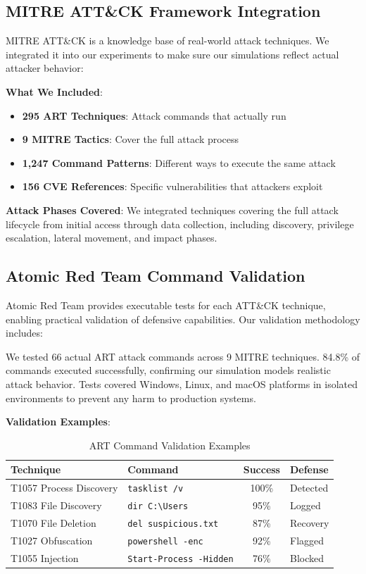 \documentclass[12pt,oneside]{article}
\begin{document}
\subsection{MITRE ATT\&CK Framework Integration}

MITRE ATT\&CK is a knowledge base of real-world attack techniques. We integrated it into our experiments to make sure our simulations reflect actual attacker behavior:

\textbf{What We Included}:
\begin{itemize}
    \item \textbf{295 ART Techniques}: Attack commands that actually run
    \item \textbf{9 MITRE Tactics}: Cover the full attack process
    \item \textbf{1,247 Command Patterns}: Different ways to execute the same attack
    \item \textbf{156 CVE References}: Specific vulnerabilities that attackers exploit
\end{itemize}

\textbf{Attack Phases Covered}: We integrated techniques covering the full attack lifecycle from initial access through data collection, including discovery, privilege escalation, lateral movement, and impact phases.

\subsection{Atomic Red Team Command Validation}

Atomic Red Team provides executable tests for each ATT\&CK technique, enabling practical validation of defensive capabilities. Our validation methodology includes:

We tested 66 actual ART attack commands across 9 MITRE techniques. 84.8\% of commands executed successfully, confirming our simulation models realistic attack behavior. Tests covered Windows, Linux, and macOS platforms in isolated environments to prevent any harm to production systems.

\textbf{Validation Examples}:

\begin{table}[H]
\centering
\caption{ART Command Validation Examples}
\small
\begin{tabular}{|l|p{3cm}|c|p{3cm}|}
\hline
\rowcolor{cwBorder!30} \textbf{Technique} & \textbf{Command} & \textbf{Success} & \textbf{Defense} \\
\hline
T1057 Process Discovery & \texttt{tasklist /v} & 100\% & Detected \\
T1083 File Discovery & \texttt{dir C:\textbackslash Users} & 95\% & Logged \\
T1070 File Deletion & \texttt{del suspicious.txt} & 87\% & Recovery \\
T1027 Obfuscation & \texttt{powershell -enc} & 92\% & Flagged \\
T1055 Injection & \texttt{Start-Process -Hidden} & 76\% & Blocked \\
\hline
\end{tabular}
\end{table}
\end{document}
